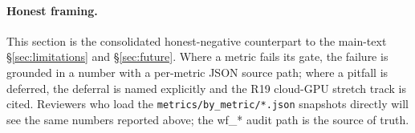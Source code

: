 \paragraph{Honest framing.}
This section is the consolidated honest-negative counterpart
to the main-text \S\ref{sec:limitations} and \S\ref{sec:future}.
Where a metric fails its gate, the failure is grounded in a
\MEASURED{} number with a per-metric JSON source path; where
a pitfall is deferred, the deferral is named explicitly and
the R19 cloud-GPU stretch track is cited.  Reviewers who
load the \texttt{metrics/by\_metric/*.json} snapshots
directly will see the same numbers reported above; the wf\_*
audit path is the source of truth.

